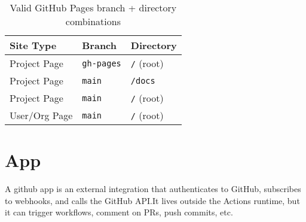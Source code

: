 \documentclass[openany, 12pt]{book}
\begin{document}
\begin{table}[h]
	\centering
	\begin{tabular}{lll}
		\toprule
		\textbf{Site Type} & \textbf{Branch}   & \textbf{Directory} \\
		\midrule
		Project Page       & \texttt{gh-pages} & \texttt{/} (root)  \\
		Project Page       & \texttt{main}     & \texttt{/docs}     \\
		Project Page       & \texttt{main}     & \texttt{/} (root)  \\
		User/Org Page      & \texttt{main}     & \texttt{/} (root)  \\
		\bottomrule
	\end{tabular}
	\caption{Valid GitHub Pages branch + directory combinations}
\end{table}

\chapter{App}
A github app is an external integration that authenticates to GitHub, subscribes
to webhooks, and calls the GitHub API.\@  It lives outside the Actions runtime, but
it can trigger workflows, comment on PRs, push commits, etc.
\end{document}
